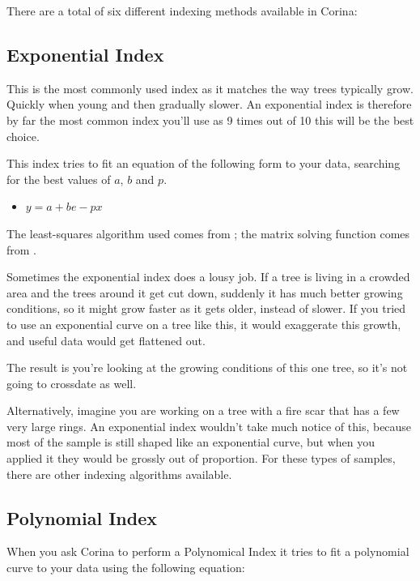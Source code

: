There are a total of six different indexing methods available in Corina:

\subsection{Exponential Index}
This is the most commonly used index as it matches the way trees typically grow. Quickly when young and then gradually slower.  An exponential index is therefore by far the most common index you'll use as 9 times out of 10 this will be the best choice. 

This index tries to fit an equation of the following form to your data, searching for the best values of $a$, $b$ and $p$. 
\begin{itemize}
 \item $y = a + be-px$ 
\end{itemize}


The least-squares algorithm used comes from \citet{CLR}; the matrix solving function comes from \citet{vanLoan}.

Sometimes the exponential index does a lousy job. If a tree is living in a crowded area and the trees around it get cut down, suddenly it has much better growing conditions, so it might grow faster as it gets older, instead of slower. If you tried to use an exponential curve on a tree like this, it would exaggerate this growth, and useful data would get flattened out.

The result is you're looking at the growing conditions of this one tree, so it's not going to crossdate as well.

Alternatively, imagine you are working on a tree with a fire scar that has a few very large rings. An exponential index wouldn't take much notice of this, because most of the sample is still shaped like an exponential curve, but when you applied it they would be grossly out of proportion. For these types of samples, there are other indexing algorithms available.


\subsection{Polynomial Index}
When you ask Corina to perform a Polynomical Index it tries to fit a polynomial curve to your data using the following equation: 

